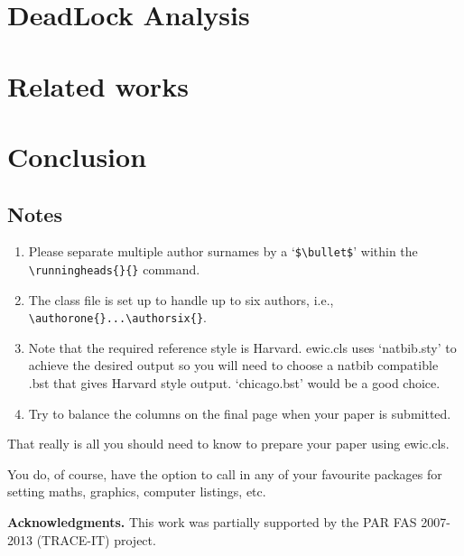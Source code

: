 \documentclass{ewic}
\begin{document}
\section{DeadLock Analysis}
%

\section{Related works}
%
\section{Conclusion}
%


\subsection{Notes}
\begin{enumerate}
\item Please separate multiple author surnames by a `\verb+$\bullet$+' within the
\verb+\runningheads{}{}+ command.

\pagebreak

\item The class file is set up to handle up to six authors, i.e., \verb+\authorone{}...\authorsix{}+.

\item Note that the required reference style is Harvard. ewic.cls
uses `natbib.sty' to achieve the desired output so you will need
to choose a natbib compatible .bst that gives Harvard style
output. `chicago.bst' would be a good choice.

\item Try to balance the columns on the final page when your paper is submitted.
\end{enumerate}

That really is all you should need to know to prepare your paper
using ewic.cls.

You do, of course, have the option to call in any of your
favourite packages for setting maths, graphics, computer listings,
etc.

\textbf{Acknowledgments. }
This work was partially supported by the PAR FAS 2007-2013 (TRACE-IT) project.

%
%
%
%



\end{document}
